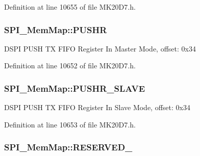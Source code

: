 Definition at line 10655 of file M\+K20\+D7.\+h.

\subsubsection[{\texorpdfstring{P\+U\+S\+HR}{PUSHR}}]{ S\+P\+I\+\_\+\+Mem\+Map\+::\+P\+U\+S\+HR}\hypertarget{struct_s_p_i___mem_map_a9b91ea535dc969f210119d1cad2a246e}{}\label{struct_s_p_i___mem_map_a9b91ea535dc969f210119d1cad2a246e}
D\+S\+PI P\+U\+SH TX F\+I\+FO Register In Master Mode, offset\+: 0x34 

Definition at line 10652 of file M\+K20\+D7.\+h.

\subsubsection[{\texorpdfstring{P\+U\+S\+H\+R\+\_\+\+S\+L\+A\+VE}{PUSHR_SLAVE}}]{ S\+P\+I\+\_\+\+Mem\+Map\+::\+P\+U\+S\+H\+R\+\_\+\+S\+L\+A\+VE}\hypertarget{struct_s_p_i___mem_map_a22553d476505bf3416a55f681a70774e}{}\label{struct_s_p_i___mem_map_a22553d476505bf3416a55f681a70774e}
D\+S\+PI P\+U\+SH TX F\+I\+FO Register In Slave Mode, offset\+: 0x34 

Definition at line 10653 of file M\+K20\+D7.\+h.

\subsubsection[{\texorpdfstring{R\+E\+S\+E\+R\+V\+E\+D\+\_\+0}{RESERVED_0}}]{ S\+P\+I\+\_\+\+Mem\+Map\+::\+R\+E\+S\+E\+R\+V\+E\+D\+\_}\hypertarget{struct_s_p_i___mem_map_a14519397e998939f8227f49844380512}{}\label{struct_s_p_i___mem_map_a14519397e998939f8227f49844380512}


